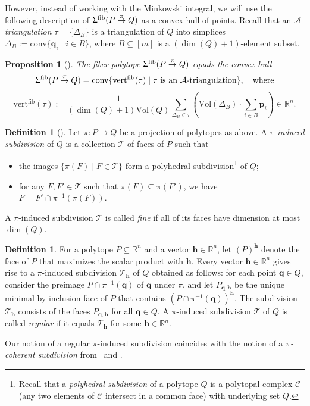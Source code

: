 \documentclass[11pt]{amsart}
\theoremstyle{plain}
\newtheorem{proposition}[theorem]{Proposition}
\theoremstyle{definition}
\newtheorem{definition}[theorem]{Definition}
\def\R{\mathbb{R}}
\def\p{{\bm{p}}}
\def\q{{\bm{q}}}
\def\Acal{\mathcal{A}}
\def\h{{\bm{h}}}
\def\conv{\mathrm{conv}}
\def\Tr{\tau}
\def\Vol{\mathrm{Vol}}
\def\vert{\mathrm{vert}}
\def\vertFib{\vert^\fiber}
\def\fiber{{\operatorname{fib}}}
\def\FibPoly{\Upsigma^\fiber}
\def\pito{\overset \pi \to}
\def\Tcal{\mathcal{T}}
\def\Tiling{\Tcal}
\let\subset\subseteq
\begin{document}
However, instead of working with the Minkowski integral, we will use 
the following description of 
 $\FibPoly(P\pito Q)$ as a convex hull of points. Recall that an \emph{$\Acal$-triangulation} $\Tr=\{\Delta_B\}$ is a triangulation of $Q$ into simplices $\Delta_B:=\conv\{\q_i\mid i\in B\}$, where $B\subset [m]$ is a $(\dim(Q)+1)$-element subset.

\begin{proposition}[{\cite[Corollary~2.6]{BS}}]\label{prop:BS_triang}
  The fiber polytope $\FibPoly(P\pito Q)$ equals the convex hull \[\FibPoly(P\pito Q)=\conv\{\vertFib(\Tr)\mid \Tr\text{ is an $\Acal$-triangulation}\},\quad\text{where}\] 
\begin{equation}\label{eq:vertFib}
  \vertFib(\Tr):=\frac1{(\dim(Q)+1) \Vol(Q)} \sum_{\Delta_B\in \Tr}  \left(\Vol(\Delta_B) \cdot \sum_{i\in B} \p_i\right) \in \R^n.
\end{equation}
\end{proposition}



\begin{definition}[{\cite[Definition~9.1]{Ziegler}}]
	\label{dfn:pi_induced}
Let $\pi:P\to Q$ be a projection of polytopes as above.
	A \emph{$\pi$-induced subdivision} of $Q$  is a collection $\Tiling$ of faces of $P$ such that
\begin{itemize}
\item the images $\{\pi(F)\mid F\in \Tiling\}$ form a polyhedral subdivision\footnote{Recall that a \emph{polyhedral subdivision}
of a polytope $Q$ is a polytopal complex $\mathcal{C}$
(any two elements of $\mathcal{C}$ intersect in a common face)
with underlying set $Q$.} of $Q$;
\item for any $F,F'\in\Tiling$ such that $\pi(F)\subset\pi(F')$, we have $F=F'\cap \pi^{-1}(\pi(F))$. 
\end{itemize}
A $\pi$-induced subdivision $\Tiling$ is called \emph{fine} if all of its faces have dimension at most $\dim(Q)$.
\end{definition}



\begin{definition}\label{dfn:pi_regular}
For a polytope $P\subset \R^n$ and a vector $\h\in\R^n$, let $(P)^\h$ denote the face of $P$ that maximizes the scalar product with $\h$. Every vector $\h\in\R^n$ gives rise to a $\pi$-induced subdivision $\Tiling_\h$ of $Q$ obtained as follows: for each point $\q\in Q$, consider the preimage $P\cap \pi^{-1}(\q)$ of $\q$ under $\pi$, and let $P_{\q,\h}$ be the unique minimal by inclusion face of $P$ that contains $(P\cap \pi^{-1}(\q))^\h$. The subdivision $\Tiling_\h$ consists of the faces $P_{\q,\h}$ for all $\q\in Q$. 
	A $\pi$-induced subdivision $\Tiling$ of $Q$ is called \emph{regular} if it equals  $\Tiling_\h$ for some $\h\in\R^n$.
\end{definition}
\noindent 
Our notion of a regular $\pi$-induced subdivision coincides 
with the notion of a \emph{$\pi$-coherent subdivision} 
from~\cite[Section 1]{BS} and \cite[Definition 9.2]{Ziegler}.
\end{document}
